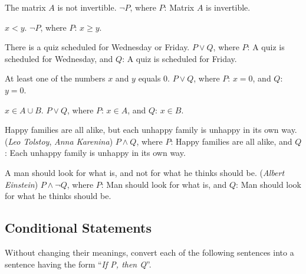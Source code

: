 \documentclass[DIN, pagenumber=false, fontsize=11pt, parskip=half]{scrartcl}
\begin{document}
\begin{problems}
    \problem The matrix $A$ is not invertible.
    \answer  $\lnot P$, where $P$: Matrix $A$ is invertible.

    \problem $x < y$.
    \answer  $\lnot P$, where $P$: $x \geq y$.

    \problem There is a quiz scheduled for Wednesday or Friday.
    \answer  $P \lor Q$, where $P$: A quiz is scheduled for Wednesday, and $Q$: A quiz is scheduled for Friday.

    \problem At least one of the numbers $x$ and $y$ equals $0$.
    \answer  $P \lor Q$, where $P$: $x = 0$, and $Q$: $y = 0$.

    \problem $x \in A \cup B$.
    \answer  $P \lor Q$, where $P$: $x \in A$, and $Q$: $x \in B$.

    \problem Happy families are all alike, but each unhappy family is unhappy in its own way. (\textit{Leo Tolstoy}, \textit{Anna Karenina})
    \answer  $P \land Q$, where $P$: Happy families are all alike, and $Q$: Each unhappy family is unhappy in its own way.

    \problem A man should look for what is, and not for what he thinks should be. (\textit{Albert Einstein})
    \answer  $P \land \lnot Q$, where $P$: Man should look for what is, and $Q$: Man should look for what he thinks should be.
\end{problems}

\subsection{Conditional Statements}

\begin{exercise}{}
    Without changing their meanings, convert each of the following sentences into a sentence having the form ``\textit{If P, then Q}''.
\end{exercise}
\end{document}
